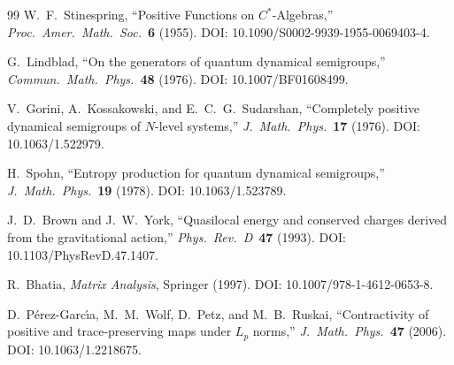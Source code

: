 \documentclass[11pt]{article}
\theoremstyle{definition}
\theoremstyle{plain}
\theoremstyle{remark}
\begin{document}
\begin{thebibliography}{99}
W.\ F.\ Stinespring,
``Positive Functions on $C^\ast$-Algebras,''
\emph{Proc.\ Amer.\ Math.\ Soc.}\ \textbf{6} (1955).
DOI: 10.1090/S0002-9939-1955-0069403-4.

G.\ Lindblad,
``On the generators of quantum dynamical semigroups,''
\emph{Commun.\ Math.\ Phys.}\ \textbf{48} (1976).
DOI: 10.1007/BF01608499.

V.\ Gorini, A.\ Kossakowski, and E.\ C.\ G.\ Sudarshan,
``Completely positive dynamical semigroups of $N$-level systems,''
\emph{J.\ Math.\ Phys.}\ \textbf{17} (1976).
DOI: 10.1063/1.522979.

H.\ Spohn,
``Entropy production for quantum dynamical semigroups,''
\emph{J.\ Math.\ Phys.}\ \textbf{19} (1978).
DOI: 10.1063/1.523789.

J.\ D.\ Brown and J.\ W.\ York,
``Quasilocal energy and conserved charges derived from the gravitational action,''
\emph{Phys.\ Rev.\ D}\ \textbf{47} (1993).
DOI: 10.1103/PhysRevD.47.1407.

R.\ Bhatia,
\emph{Matrix Analysis},
Springer (1997).
DOI: 10.1007/978-1-4612-0653-8.

D.\ P\'erez-Garc\'{\i}a, M.\ M.\ Wolf, D.\ Petz, and M.\ B.\ Ruskai,
``Contractivity of positive and trace-preserving maps under $L_p$ norms,''
\emph{J.\ Math.\ Phys.}\ \textbf{47} (2006).
DOI: 10.1063/1.2218675.
\end{thebibliography}
\end{document}
